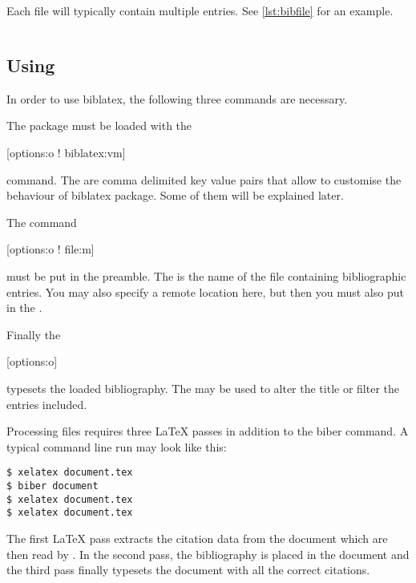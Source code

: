 Each  file will typically contain multiple entries. See
\autoref{lst:bibfile} for an example.

\begin{listing}[htp]
  \begin{lined}{\textwidth}
    \inputminted{bibtex}{src/examples/example.bib}
  \end{lined}
  \caption[An example of bibliography database]{An example bibliography
    database for  ( file)}\label{lst:bibfile}
\end{listing}

\subsection{Using }

In order to use biblatex, the following three commands are necessary.

The  package must be loaded with the
\begin{lscommand}
  [options:o ! biblatex:vm]
\end{lscommand}
command. The  are comma delimited key value pairs that allow to
customise the behaviour of biblatex package. Some of them will be explained
later.

The command
\begin{lscommand}
  [options:o ! file:m]
\end{lscommand}
must be put in the preamble. The  is the name of the  file
containing bibliographic entries. You may also specify a remote location here,
but then you must also put  in the .

Finally the
\begin{lscommand}
  [options:o]
\end{lscommand}
typesets the loaded bibliography. The  may be used to alter the
title or filter the entries included.

Processing files requires three \LaTeX{} passes in addition to the biber
command. A typical command line run may look like this:
\begin{code}
\begin{verbatim}
$ xelatex document.tex
$ biber document
$ xelatex document.tex
$ xelatex document.tex
\end{verbatim}
\end{code}
The first \LaTeX{} pass extracts the citation data from the document which are
then read by . In the second pass, the bibliography is placed in the
document and the third pass finally typesets the document with all the correct citations.


